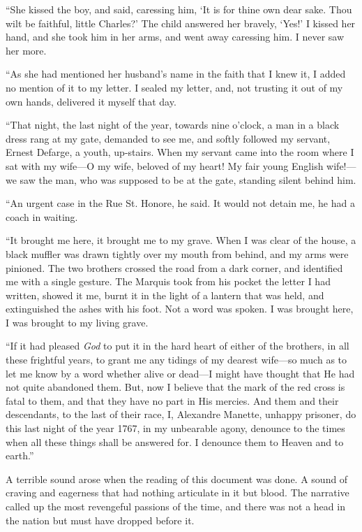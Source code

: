 ``She kissed the boy, and said, caressing him, `It is for thine own
dear sake.  Thou wilt be faithful, little Charles?' The child
answered her bravely, `Yes!' I kissed her hand, and she took him in
her arms, and went away caressing him.  I never saw her more.

``As she had mentioned her husband's name in the faith that I knew it,
I added no mention of it to my letter.  I sealed my letter, and, not
trusting it out of my own hands, delivered it myself that day.

``That night, the last night of the year, towards nine o'clock, a man
in a black dress rang at my gate, demanded to see me, and softly
followed my servant, Ernest Defarge, a youth, up-stairs.  When my
servant came into the room where I sat with my wife---O my wife,
beloved of my heart!  My fair young English wife!---we saw the man,
who was supposed to be at the gate, standing silent behind him.

``An urgent case in the Rue St. Honore, he said.  It would not detain
me, he had a coach in waiting.

``It brought me here, it brought me to my grave.  When I was clear of
the house, a black muffler was drawn tightly over my mouth from
behind, and my arms were pinioned.  The two brothers crossed the road
from a dark corner, and identified me with a single gesture.  The
Marquis took from his pocket the letter I had written, showed it me,
burnt it in the light of a lantern that was held, and extinguished
the ashes with his foot.  Not a word was spoken.  I was brought here,
I was brought to my living grave.

``If it had pleased \emph{God} to put it in the hard heart of either of the
brothers, in all these frightful years, to grant me any tidings of my
dearest wife---so much as to let me know by a word whether alive or
dead---I might have thought that He had not quite abandoned them.
But, now I believe that the mark of the red cross is fatal to them,
and that they have no part in His mercies.  And them and their
descendants, to the last of their race, I, Alexandre Manette, unhappy
prisoner, do this last night of the year 1767, in my unbearable agony,
denounce to the times when all these things shall be answered for.
I denounce them to Heaven and to earth.''

A terrible sound arose when the reading of this document was done. A
sound of craving and eagerness that had nothing articulate in it but
blood.  The narrative called up the most revengeful passions of the
time, and there was not a head in the nation but must have dropped
before it.

